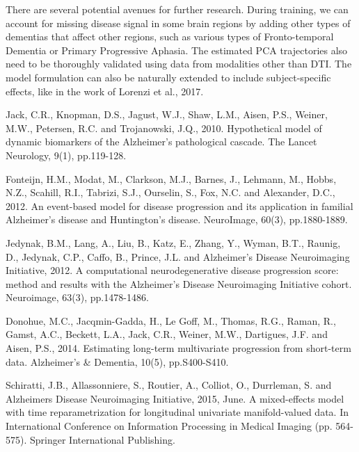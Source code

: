 \documentclass{llncs}
\begin{document}
There are several potential avenues for further research. During training, we can account for missing disease signal in some brain regions by adding other types of dementias that affect other regions, such as various types of Fronto-temporal Dementia or Primary Progressive Aphasia. The estimated PCA trajectories also need to be thoroughly validated using data from modalities other than DTI. The model formulation can also be naturally extended to include subject-specific effects, like in the work of Lorenzi et al., 2017.

%


\begin{thebibliography}{5}

Jack, C.R., Knopman, D.S., Jagust, W.J., Shaw, L.M., Aisen, P.S., Weiner, M.W., Petersen, R.C. and Trojanowski, J.Q., 2010. Hypothetical model of dynamic biomarkers of the Alzheimer's pathological cascade. The Lancet Neurology, 9(1), pp.119-128.

Fonteijn, H.M., Modat, M., Clarkson, M.J., Barnes, J., Lehmann, M., Hobbs, N.Z., Scahill, R.I., Tabrizi, S.J., Ourselin, S., Fox, N.C. and Alexander, D.C., 2012. An event-based model for disease progression and its application in familial Alzheimer's disease and Huntington's disease. NeuroImage, 60(3), pp.1880-1889.

Jedynak, B.M., Lang, A., Liu, B., Katz, E., Zhang, Y., Wyman, B.T., Raunig, D., Jedynak, C.P., Caffo, B., Prince, J.L. and Alzheimer's Disease Neuroimaging Initiative, 2012. A computational neurodegenerative disease progression score: method and results with the Alzheimer's Disease Neuroimaging Initiative cohort. Neuroimage, 63(3), pp.1478-1486.

Donohue, M.C., Jacqmin-Gadda, H., Le Goff, M., Thomas, R.G., Raman, R., Gamst, A.C., Beckett, L.A., Jack, C.R., Weiner, M.W., Dartigues, J.F. and Aisen, P.S., 2014. Estimating long-term multivariate progression from short-term data. Alzheimer's \& Dementia, 10(5), pp.S400-S410.

Schiratti, J.B., Allassonniere, S., Routier, A., Colliot, O., Durrleman, S. and Alzheimers Disease Neuroimaging Initiative, 2015, June. A mixed-effects model with time reparametrization for longitudinal univariate manifold-valued data. In International Conference on Information Processing in Medical Imaging (pp. 564-575). Springer International Publishing.



\end{thebibliography}
\end{document}
